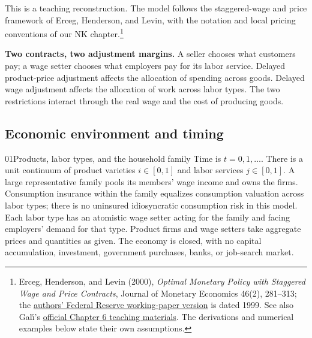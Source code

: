 This is a teaching reconstruction. The model follows the staggered-wage and
price framework of Erceg, Henderson, and Levin, with the notation and local
pricing conventions of our NK chapter.\footnote{Erceg, Henderson, and Levin
(2000), \textit{Optimal Monetary Policy with Staggered Wage and Price Contracts},
Journal of Monetary Economics 46(2), 281--313; the
\href{https://www.federalreserve.gov/econres/ifdp/optimal-monetary-policy-with-staggered-wage-and-price-contracts.htm}{authors' Federal Reserve working-paper version}
is dated 1999. See also Gal\'{\i}'s
\href{https://crei.cat/people/gali/}{official Chapter 6 teaching materials}.
The derivations and numerical examples below state their own assumptions.}

\begin{greenblock}
\textbf{Two contracts, two adjustment margins.}
A seller chooses what customers pay; a wage setter chooses what employers
pay for its labor service. Delayed product-price adjustment affects the
allocation of spending across goods. Delayed wage adjustment affects the
allocation of work across labor types. The two restrictions interact through
the real wage and the cost of producing goods.
\end{greenblock}

\subsection{Economic environment and timing}

\begin{modelsetup}[1]
\begin{modelcondition}{01}{Products, labor types, and the household family}
Time is $t=0,1,\ldots$. There is a unit continuum of product varieties
$i\in[0,1]$ and labor services $j\in[0,1]$. A large representative family pools
its members' wage income and owns the firms. Consumption insurance within the
family equalizes consumption valuation across labor types; there is no
uninsured idiosyncratic consumption risk in this model. Each labor type has an
atomistic wage setter acting for the family and facing employers' demand for
that type. Product firms and wage setters take aggregate prices and quantities
as given. The economy is closed, with no capital accumulation, investment,
government purchases, banks, or job-search market.
\end{modelcondition}
\end{modelsetup}

